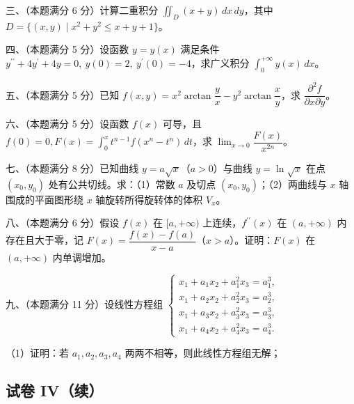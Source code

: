\documentclass[UTF8,12pt]{ctexart}
\begin{document}
三、（本题满分 6 分）计算二重积分 \(\displaystyle \iint_D(x+y)\,dx\,dy\)，其中 \(\displaystyle D=\{(x,\allowbreak y)\mid x^2+y^2\leq x+y+1\}\)。


四、（本题满分 5 分）设函数 \(\displaystyle y=y(x)\) 满足条件 \(\displaystyle y^{\prime\prime}+4y^{\prime}+4y=0,\allowbreak \ y(0)=2,\allowbreak \ y^{\prime}(0)=-4\)，求广义积分 \(\displaystyle \int_0^{+\infty}y(x)\,dx\)。


五、（本题满分 5 分）已知 \(\displaystyle f(x,\allowbreak y)=x^2\arctan\dfrac{\displaystyle y}{\displaystyle x}-y^2\arctan\dfrac{\displaystyle x}{\displaystyle y}\)，求 \(\displaystyle \dfrac{\displaystyle \partial^2 f}{\displaystyle \partial x\partial y}\)。


六、（本题满分 5 分）设函数 \(\displaystyle f(x)\) 可导，且 \(\displaystyle f(0)=0,\allowbreak  F(x)=\displaystyle \int_0^x t^{n-1}f(x^n-t^n)\,dt\)，求 \(\displaystyle \lim_{x\to0}\dfrac{\displaystyle F(x)}{\displaystyle x^{2n}}\)。


七、（本题满分 8 分）已知曲线 \(\displaystyle y=a\sqrt x\)（\(\displaystyle a>0\)）与曲线 \(\displaystyle y=\ln\sqrt x\) 在点 \(\displaystyle (x_0,\allowbreak y_0)\) 处有公共切线。求：（1）常数 \(\displaystyle a\) 及切点 \(\displaystyle (x_0,\allowbreak y_0)\)；（2）两曲线与 \(\displaystyle x\) 轴围成的平面图形绕 \(\displaystyle x\) 轴旋转所得旋转体的体积 \(\displaystyle V_x\)。


八、（本题满分 6 分）假设 \(\displaystyle f(x)\) 在 \(\displaystyle [a,\allowbreak +\infty)\) 上连续，\(\displaystyle f^{\prime\prime}(x)\) 在 \(\displaystyle (a,\allowbreak +\infty)\) 内存在且大于零，记 \(\displaystyle F(x)=\dfrac{\displaystyle f(x)-f(a)}{\displaystyle x-a}\)（\(\displaystyle x>a\)）。证明：\(\displaystyle F(x)\) 在 \(\displaystyle (a,\allowbreak +\infty)\) 内单调增加。


九、（本题满分 11 分）设线性方程组 \(\displaystyle \begin{cases}x_1+a_1x_2+a_1^2x_3=a_1^3,\allowbreak \\x_1+a_2x_2+a_2^2x_3=a_2^3,\allowbreak \\x_1+a_3x_2+a_3^2x_3=a_3^3,\allowbreak \\x_1+a_4x_2+a_4^2x_3=a_4^3.\end{cases}\)


（1）证明：若 \(\displaystyle a_1,\allowbreak a_2,\allowbreak a_3,\allowbreak a_4\) 两两不相等，则此线性方程组无解；


\subsection*{试卷 IV（续）}
\end{document}

